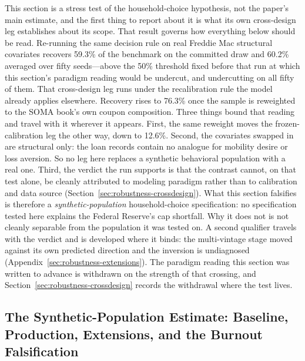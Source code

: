 \documentclass[12pt]{article}
\begin{document}
This section is a stress test of the household-choice hypothesis, not the paper's main estimate, and the first thing to report about it is what its own cross-design leg establishes about its scope. That result governs how everything below should be read. Re-running the same decision rule on real Freddie Mac structural covariates recovers 59.3\% of the benchmark on the committed draw and 60.2\% averaged over fifty seeds---above the 50\% threshold fixed before that run at which this section's paradigm reading would be undercut, and undercutting on all fifty of them. That cross-design leg runs under the recalibration rule the model already applies elsewhere. Recovery rises to 76.3\% once the sample is reweighted to the SOMA book's own coupon composition. Three things bound that reading and travel with it wherever it appears. First, the same reweight moves the frozen-calibration leg the other way, down to 12.6\%. Second, the covariates swapped in are structural only: the loan records contain no analogue for mobility desire or loss aversion. So no leg here replaces a synthetic behavioral population with a real one. Third, the verdict the run supports is that the contrast cannot, on that test alone, be cleanly attributed to modeling paradigm rather than to calibration and data source (Section~\ref{sec:robustness-crossdesign}). What this section falsifies is therefore a \emph{synthetic-population} household-choice specification: no specification tested here explains the Federal Reserve's cap shortfall. Why it does not is not cleanly separable from the population it was tested on. A second qualifier travels with the verdict and is developed where it binds: the multi-vintage stage moved against its own predicted direction and the inversion is undiagnosed (Appendix~\ref{sec:robustness-extensions}). The paradigm reading this section was written to advance is withdrawn on the strength of that crossing, and Section~\ref{sec:robustness-crossdesign} records the withdrawal where the test lives.

\subsection{The Synthetic-Population Estimate: Baseline, Production, Extensions, and the Burnout Falsification}\label{sec:abm-results}
\end{document}

